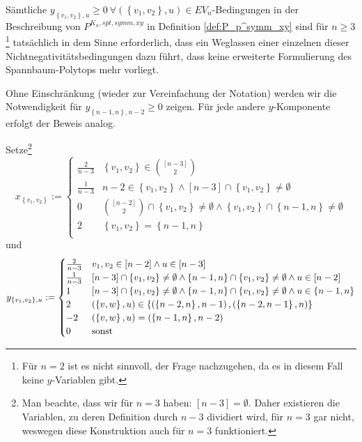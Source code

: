 \documentclass[10p,a4paper,BCOR = 12mm, DIV=15]{scrbook}
\begin{document}
{\begin{Sa}
Sämtliche $y_{\left\{v_1, v_2\right\}, u} \geq 0 \ \forall \left(\left\{v_1, v_2\right\}, u\right) \in EV_n$-Bedingungen in der Beschreibung von $P^{K_n, spt, symm, xy}$ in Definition \ref{def:P_p^symm_xy} sind für $n\geq 3$\footnote{Für $n=2$ ist es nicht sinnvoll, der Frage nachzugehen, da es in diesem Fall keine $y$-Variablen gibt.} tatsächlich in dem Sinne erforderlich, dass ein Weglassen einer einzelnen dieser Nichtnegativitätsbedingungen dazu führt, dass keine erweiterte Formulierung des Spannbaum-Polytops mehr vorliegt.
\end{Sa}
\begin{bew}
Ohne Einschränkung (wieder zur Vereinfachung der Notation) werden wir die Notwendigkeit für $y_{\left\{n-1, n\right\}, n-2} \geq 0$ zeigen. Für jede andere $y$-Komponente erfolgt der Beweis analog.

Setze\footnote{Man beachte, dass wir für $n=3$  haben: $\left[n-3\right] = \emptyset$. Daher existieren die Variablen, zu deren Definition durch $n-3$ dividiert wird, für $n=3$ gar nicht, weswegen diese Konstruktion auch für $n=3$ funktioniert.}
\begin{displaymath}
x_{\left\{v_1, v_2\right\}} := \begin{cases}
\frac{2}{n-3} & \left\{v_1, v_2\right\} \in {[n-3] \choose 2} \\
\frac{1}{n-3} & n-2 \in \left\{v_1, v_2\right\} \wedge \left[n-3\right] \cap \left\{v_1, v_2\right\} \neq \emptyset \\
0 & {[n-2] \choose 2} \cap \left\{v_1, v_2\right\} \neq \emptyset \wedge \left\{v_1, v_2\right\} \cap \left\{n-1, n\right\} \neq \emptyset \\
2 & \left\{v_1, v_2\right\} = \left\{n-1, n\right\} \\
\end{cases}
\end{displaymath}
und
\begin{displaymath}
y_{\left\{v_1, v_2\right\}, u} := \begin{cases}
\frac{2}{n-3} & v_1, v_2 \in \left[n-2\right] \wedge u \in \left[n-3\right] \\
\frac{1}{n-3} & \left[n-3\right] \cap \left\{v_1, v_2\right\} \neq \emptyset \wedge \left\{n-1, n\right\} \cap \left\{v_1, v_2\right\} \neq \emptyset \wedge u\in \left[n-2\right] \\
1 & \left[n-3\right] \cap \left\{v_1, v_2\right\} \neq \emptyset \wedge \left\{n-1, n\right\} \cap \left\{v_1, v_2\right\} \neq \emptyset \wedge u\in \left\{n-1, n\right\} \\
2 & \left(\left\{v, w\right\}, u\right) \in \left\{ \left(\left\{n-2, n\right\}, n-1\right), \left(\left\{n-2, n-1\right\}, n\right)\right\} \\
-2 & \left(\left\{v, w\right\}, u\right) = \left(\left\{n-1, n\right\}, n-2\right) \\
0 & \textnormal{sonst}
\end{cases}
\end{displaymath}


\end{bew}}
\end{document}
